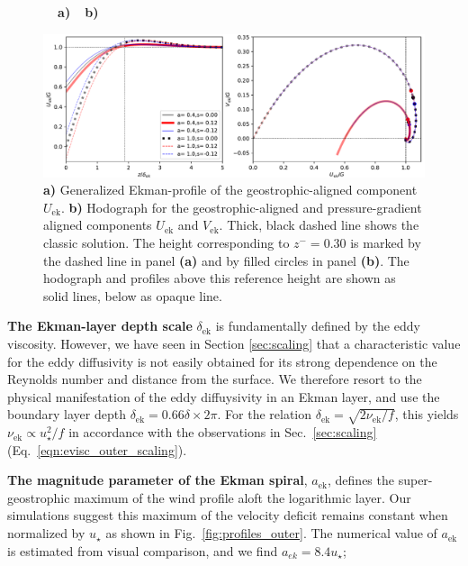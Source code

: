 \documentclass[smallcondensed,final]{svjour3}
\begin{document}
\begin{figure}
  \begin{flushleft}
    \textbf{\ \ a)}\hspace{0.45\textwidth}\textbf{\ \ b)}\\
  \end{flushleft} 
  \includegraphics[width=\textwidth]{../plot/ekman_ideal.pdf}
  \caption{\label{fig:ekman_ideal}
    \textbf{a)} Generalized Ekman-profile of the geostrophic-aligned component $U_\mathrm{ek}$.
    \textbf{b)} Hodograph for the geostrophic-aligned and pressure-gradient aligned components $U_\mathrm{ek}$ and $V_\mathrm{ek}$.
    Thick, black dashed line shows the classic solution. The height corresponding to $z^-=0.30$ is marked by the dashed line in panel \textbf{(a)}
    and by filled circles in panel \textbf{(b)}. The hodograph and profiles above this reference height are
    shown as solid lines, below as opaque line.
  } 
\end{figure} 
%
\textbf{The Ekman-layer depth scale} $\delta_\mathrm{ek}$ is fundamentally defined by the eddy viscosity.
%
However, we have seen in Section \ref{sec:scaling} that a characteristic value for the eddy diffusivity
is not easily obtained for its strong dependence on the Reynolds number and distance from the surface.
%
We therefore resort to the physical manifestation of the eddy diffuysivity in an Ekman layer, and use the
boundary layer depth $\delta_\mathrm{ek} = 0.66 \delta \times 2\pi$.
%
For the relation $\delta_\mathrm{ek}=\sqrt{2\nu_\mathrm{ek}/f}$, this yields
$\nu_\mathrm{ek} \propto u_\star^2/f$ in accordance with the observations in
Sec.~\ref{sec:scaling} (Eq.~\ref{eqn:evisc_outer_scaling}). 
%
\par
%
\textbf{The magnitude parameter of the Ekman spiral}, $a_\mathrm{ek}$, defines the super-geostrophic maximum of the
wind profile aloft the logarithmic layer. Our simulations suggest this maximum of the velocity deficit
remains constant when normalized by $u_\star$ as shown in Fig.~\ref{fig:profiles_outer}.
%
The numerical value of $a_\mathrm{ek}$ is estimated from visual comparison, and we find $a_{ek}=8.4u_\star$;
\end{document}
